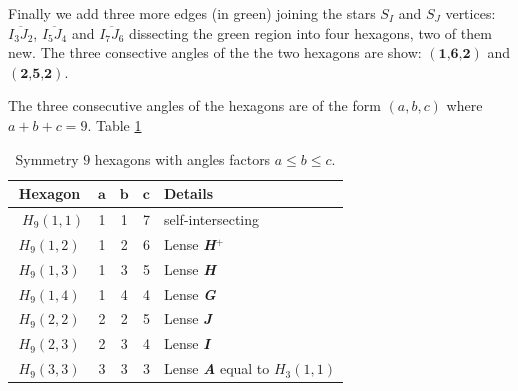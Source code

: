 \documentclass[11pt]{article}
\begin{document}
Finally we add three more edges (in green) joining the stars $S_I$ and $S_J$ vertices:
$\overline{I_3J_2}$, $\overline{I_5J_4}$ and $\overline{I_7J_6}$ dissecting the green region into four hexagons, two of them new. The three consective angles of the the two hexagons are show: $(\textbf{1,6,2})$ and $(\textbf{2,5,2})$.

The three consecutive angles of the hexagons are of the form $(a,b,c)$ where $a+b+c = 9$. Table \ref{tbl:hexagons-angles}

\begin{table}[H]
\begin{center}
\begin{tabular}{| c | c c c | l | }
\hline
Hexagon & $\textbf{a}$ & $\textbf{b}$ & $\textbf{c}$ & Details \\ \hline\
$H_9(1,1)$ & 1 & 1 & 7 & self-intersecting \\[1.1ex] \hline
$H_9(1,2)$ & 1 & 2 & 6 & Lense \textbf{\em H$^+$}\\[1.1ex] \hline
$H_9(1,3)$ & 1 & 3 & 5 & Lense \textbf{\em H} \\[1.1ex] \hline
$H_9(1,4)$ & 1 & 4 & 4 & Lense \textbf{\em G} \\[1.1ex] \hline
$H_9(2,2)$ & 2 & 2 & 5 & Lense \textbf{\em J} \\[1.1ex] \hline
$H_9(2,3)$ & 2 & 3 & 4 & Lense \textbf{\em I} \\[1.1ex] \hline
$H_9(3,3)$ & 3 & 3 & 3 & Lense \textbf{\em A} equal to $H_3(1,1)$ \\[1.1ex] \hline
\end{tabular}
\caption{Symmetry $9$ hexagons with angles factors $a \leq b \leq c$.} 
\label{tbl:hexagons-angles}
\end{center}
\end{table}
\end{document}
